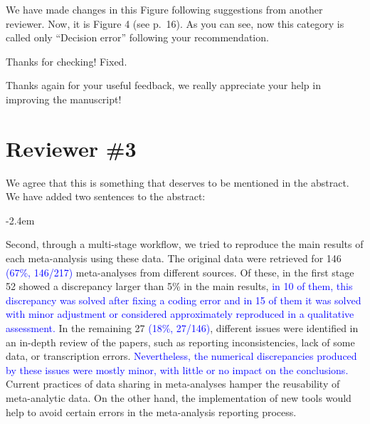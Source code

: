 \documentclass[draft]{article}
\renewenvironment{quote}{\begin{fquote}\advance\leftmargini -2.4em\begin{oldquote}}{\end{oldquote}\end{fquote}}
\newenvironment{fquote}
  {\def\FrameCommand{
	\fboxsep=0.6em %
	\fcolorbox{black}{white}}%
    \MakeFramed {\advance\hsize-2\width \FrameRestore}
    \begin{minipage}{\linewidth}
  }
  {\end{minipage}\endMakeFramed}
\begin{document}
We have made changes in this Figure following suggestions from another reviewer. Now, it is Figure 4 (see p.~16). As you can see, now this category is called only ``Decision error'' following your recommendation.


Thanks for checking! Fixed.


Thanks again for your useful feedback, we really appreciate your help in improving the manuscript!

\newpage

\hypertarget{reviewer-3}{%
\section{Reviewer \#3}\label{reviewer-3}}


We agree that this is something that deserves to be mentioned in the abstract. We have added two sentences to the abstract:

\begin{quote}
Second, through a multi-stage workflow, we tried to reproduce the main results of each meta-analysis using these data. The original data were retrieved for 146 \textcolor{blue}{(67\%, 146/217)} meta-analyses from different sources. Of these, in the first stage 52 showed a discrepancy larger than 5\% in the main results, \textcolor{blue}{in 10 of them, this discrepancy was solved after fixing a coding error and in 15 of them it was solved with minor adjustment or considered approximately reproduced in a qualitative assessment.} In the remaining 27 \textcolor{blue}{(18\%, 27/146)}, different issues were identified in an in-depth review of the papers, such as reporting inconsistencies, lack of some data, or transcription errors. \textcolor{blue}{Nevertheless, the numerical discrepancies produced by these issues were mostly minor, with little or no impact on the conclusions.} Current practices of data sharing in meta-analyses hamper the reusability of meta-analytic data. On the other hand, the implementation of new tools would help to avoid certain errors in the meta-analysis reporting process.
\end{quote}
\end{document}
